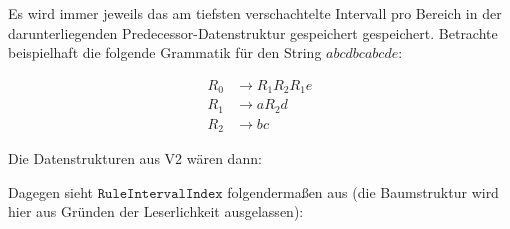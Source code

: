 Es wird immer jeweils das am tiefsten verschachtelte Intervall pro Bereich in der darunterliegenden Predecessor-Datenstruktur gespeichert gespeichert. Betrachte beispielhaft die folgende Grammatik für den String $abcdbcabcde$:

\begin{align*}
	R_0 &\rightarrow R_1 R_2 R_1 e\\
	R_1 &\rightarrow a R_2 d\\
	R_2 &\rightarrow bc
\end{align*}

Die Datenstrukturen aus V2 wären dann:

\begin{figure}[H]
	\centering
	
	\quad
\end{figure}

Dagegen sieht $\texttt{RuleIntervalIndex}$ folgendermaßen aus (die Baumstruktur wird hier aus Gründen der Leserlichkeit ausgelassen):

\begin{figure}[H]
	\centering
	
\end{figure}

